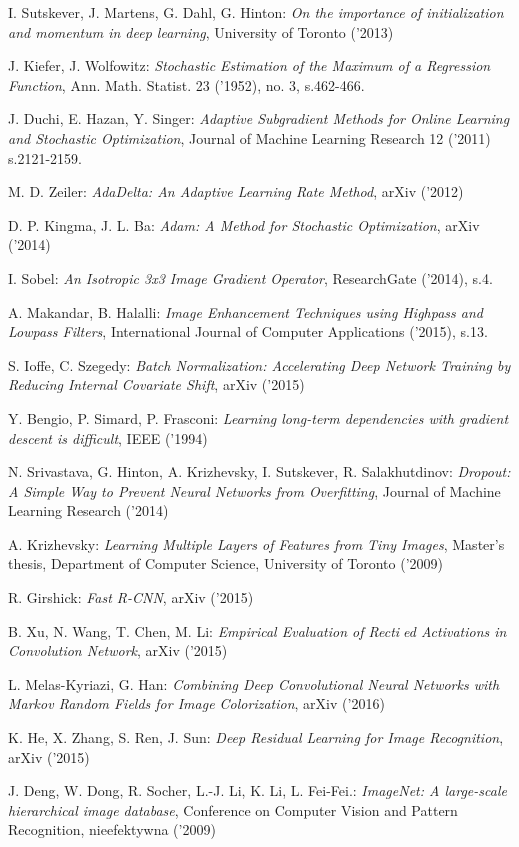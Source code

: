 \begin{thebibliography}{99}
   I. Sutskever, J. Martens, G. Dahl, G. Hinton:
  \emph{On the importance of initialization and momentum in deep learning},
  University of Toronto ('2013)

   J. Kiefer, J. Wolfowitz:
  \emph{Stochastic Estimation of the Maximum of a Regression Function},
  Ann. Math. Statist. 23 ('1952), no. 3, s.462-466.

   J. Duchi, E. Hazan, Y. Singer:
  \emph{Adaptive Subgradient Methods for Online Learning and Stochastic Optimization},
  Journal of Machine Learning Research 12 ('2011) s.2121-2159.

   M. D. Zeiler:
  \emph{AdaDelta: An Adaptive Learning Rate Method},
  arXiv ('2012)

   D. P. Kingma, J. L. Ba:
  \emph{Adam: A Method for Stochastic Optimization},
  arXiv ('2014)

   I. Sobel:
  \emph{An Isotropic 3x3 Image Gradient Operator},
  ResearchGate ('2014), s.4.

   A. Makandar, B. Halalli:
  \emph{Image Enhancement Techniques using Highpass and Lowpass Filters},
  International Journal of Computer Applications ('2015), s.13.

   S. Ioffe, C. Szegedy:
  \emph{Batch Normalization: Accelerating Deep Network Training by Reducing
  Internal Covariate Shift}, arXiv ('2015)

   Y. Bengio, P. Simard, P. Frasconi:
  \emph{Learning long-term dependencies with gradient descent is difficult},
  IEEE ('1994)

   N. Srivastava, G. Hinton, A. Krizhevsky,
  I. Sutskever, R. Salakhutdinov:
  \emph{Dropout: A Simple Way to Prevent Neural Networks from Overfitting},
  Journal of Machine Learning Research ('2014)

   A. Krizhevsky:
  \emph{Learning Multiple Layers of Features from Tiny Images},
  Master’s thesis, Department of Computer Science, University of Toronto ('2009)

   R. Girshick:
  \emph{Fast R-CNN},
  arXiv ('2015)

   B. Xu, N. Wang, T. Chen, M. Li:
  \emph{Empirical Evaluation of Rectied Activations in Convolution Network},
   arXiv ('2015)

   L. Melas-Kyriazi, G. Han:
  \emph{Combining Deep Convolutional Neural Networks with Markov Random
  Fields for Image Colorization}, arXiv ('2016)

   K. He, X. Zhang, S. Ren, J. Sun:
  \emph{Deep Residual Learning for Image Recognition}, arXiv ('2015)

  J. Deng, W. Dong, R. Socher, L.-J. Li, K. Li, L. Fei-Fei.:
  \emph{ImageNet: A large-scale hierarchical image database}, Conference on Computer Vision and Pattern Recognition, nieefektywna ('2009)

\end{thebibliography}
